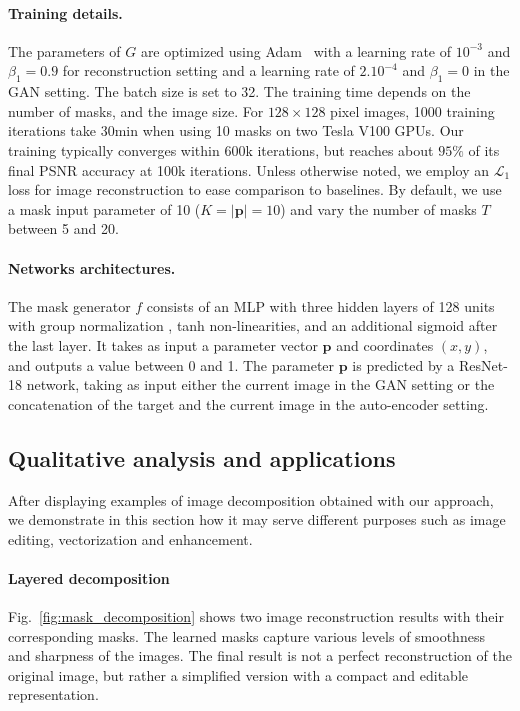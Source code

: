 \documentclass[10pt,twocolumn,letterpaper]{article}
\begin{document}
\paragraph{Training details.}
The parameters of $G$ are optimized using Adam~\cite{kingma2014adam} with a learning rate of $10^{-3}$ and $\beta_1=0.9$ for reconstruction setting and a learning rate of $2.10^{-4}$ and $\beta_1=0$ in the GAN setting. The batch size is set to 32. 
The training time depends on the number of masks, and the image size. 
For $128\times128$ pixel images, 1000 training iterations take 30min when using 10 masks on two Tesla V100 GPUs. Our training typically converges within 600k iterations, but reaches about $95\%$ of its final PSNR accuracy at 100k iterations.
Unless otherwise noted, we employ an $\mathcal{L}_1$ loss for image reconstruction to ease comparison to baselines. By default, we use a mask input parameter of 10 ($K = |\mathbf{p}| = 10$) and vary the number of masks $T$ between 5 and 20.

\paragraph{Networks architectures.} 
The mask generator $f$ consists of an MLP with three hidden layers of 128 units with group normalization \cite{wu2018group}, tanh non-linearities, and an additional sigmoid after the last layer. It takes as input a parameter vector $\mathbf{p}$ and coordinates $(x,y)$, and outputs a value between 0 and 1. The parameter $\mathbf{p}$ is predicted by a ResNet-18 network, taking as input either the current image in the GAN setting or the concatenation of the target and the current image in the auto-encoder setting.


\subsection{Qualitative analysis and applications}

After displaying examples of image decomposition obtained with our approach, we demonstrate in this section how it may serve different purposes such as image editing, vectorization and enhancement.


\paragraph{Layered decomposition}

Fig.~\ref{fig:mask_decomposition} shows two image reconstruction results with their corresponding masks. The learned masks capture various levels of smoothness and sharpness of the images. The final result is not a perfect reconstruction of the original image, but rather a simplified version with a compact and editable representation.
\end{document}
